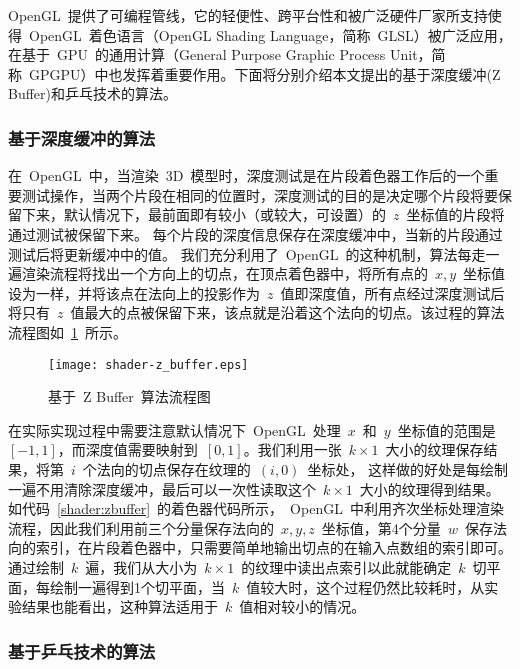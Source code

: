 OpenGL~提供了可编程管线，它的轻便性、跨平台性和被广泛硬件厂家所支持使得~OpenGL~着色语言（OpenGL Shading Language，简称~GLSL）被广泛应用，在基于~GPU~的通用计算（General
Purpose Graphic Process Unit，简称~GPGPU）中也发挥着重要作用。下面将分别介绍本文提出的基于深度缓冲(Z Buffer)和乒乓技术的算法。

\subsubsection{基于深度缓冲的算法}
	
在~OpenGL~中，当渲染~3D~模型时，深度测试是在片段着色器工作后的一个重要测试操作，当两个片段在相同的位置时，深度测试的目的是决定哪个片段将要保留下来，默认情况下，最前面即有较小（或较大，可设置）的~$z$~坐标值的片段将通过测试被保留下来。
每个片段的深度信息保存在深度缓冲中，当新的片段通过测试后将更新缓冲中的值。
我们充分利用了~OpenGL~的这种机制，算法每走一遍渲染流程将找出一个方向上的切点，在顶点着色器中，将所有点的~$x,y$~坐标值设为一样，并将该点在法向上的投影作为~$z$~值即深度值，所有点经过深度测试后将只有~$z$~值最大的点被保留下来，该点就是沿着这个法向的切点。该过程的算法流程图如~\ref{fig:flowchart:zbuffer}~所示。

\begin{figure}[htbp]
  \centering
  \texttt{[image: shader-z\_buffer.eps]}
  \caption{基于~Z Buffer~算法流程图}
  \label{fig:flowchart:zbuffer}
\end{figure}

在实际实现过程中需要注意默认情况下~OpenGL~处理~$x$~和~$y$~坐标值的范围是~$[-1,1]$，而深度值需要映射到~$[0,1]$。我们利用一张~$k \times 1$~大小的纹理保存结果，将第~$i$~个法向的切点保存在纹理的~$(i,0)$~坐标处，
这样做的好处是每绘制一遍不用清除深度缓冲，最后可以一次性读取这个~$k \times 1$~大小的纹理得到结果。
如代码~\ref{shader:zbuffer}~的着色器代码所示，~OpenGL~中利用齐次坐标处理渲染流程，因此我们利用前三个分量保存法向的~$x,y,z$~坐标值，第4个分量~$w$~保存法向的索引，在片段着色器中，只需要简单地输出切点的在输入点数组的索引即可。
通过绘制~$k$~遍，我们从大小为~$k \times 1$~的纹理中读出点索引以此就能确定~$k$~切平面，每绘制一遍得到1个切平面，当~$k$~值较大时，这个过程仍然比较耗时，从实验结果也能看出，这种算法适用于~$k$~值相对较小的情况。

%


\subsubsection{基于乒乓技术的算法}

